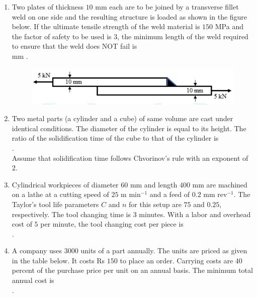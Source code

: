 \documentclass[journal]{IEEEtran}
\begin{document}
\begin{enumerate}[leftmargin=0pt]
\item
Two plates of thickness $10$ mm each are to be joined by a transverse fillet weld on one side and the resulting structure is loaded as shown in the figure below. If the ultimate tensile strength of the weld material is $150$ MPa and the factor of safety to be used is $3$, the minimum length of the weld required to ensure that the weld does NOT fail is\\
\underline{\hspace{2cm}} mm .
\begin{figure}[H]\includegraphics[width=0.5\columnwidth]{Figs/image - 2025-08-24T170927.609.png}\caption*{}\label{fig:q61}\end{figure}
\hfill{}

\item
Two metal parts (a cylinder and a cube) of same volume are cast under identical conditions. The diameter of the cylinder is equal to its height. The ratio of the solidification time of the cube to that of the cylinder is\\
\underline{\hspace{2cm}} .\\
Assume that solidification time follows Chvorinov's rule with an exponent of $2$.

\hfill{}

\item
Cylindrical workpieces of diameter $60$ mm and length $400$ mm are machined on a lathe at a cutting speed of $25$ m min$^{-1}$ and a feed of $0.2$ mm rev$^{-1}$. The Taylor's tool life parameters $C$ and $n$ for this setup are $75$ and $0.25$, respectively. The tool changing time is $3$ minutes. With a labor and overhead cost of $5$ per minute, the tool changing cost per piece is\\
\underline{\hspace{2cm}} .

\hfill{}

\item
A company uses $3000$ units of a part annually. The units are priced as given in the table below. It costs  Rs $150$ to place an order. Carrying costs are $40$ percent of the purchase price per unit on an annual basis. The minimum total annual cost is\\
\underline{\hspace{2cm}} .


\end{enumerate}
\end{document}
